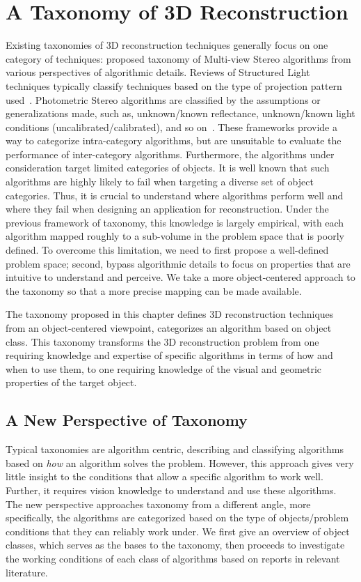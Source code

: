 
\chapter{A Taxonomy of 3D Reconstruction}
\label{ch:3DRecon_Taxo}
Existing taxonomies of 3D reconstruction techniques generally focus on one category of techniques: \citeauthor{seitz2006comparison} proposed taxonomy of Multi-view Stereo algorithms from various perspectives of algorithmic details. Reviews of Structured Light techniques typically classify techniques based on the type of projection pattern used~\cite{geng2011structured, salvi2004pattern}. Photometric Stereo algorithms are classified by the assumptions or generalizations made, such as, unknown/known reflectance, unknown/known light conditions (uncalibrated/calibrated), and so on~\cite{shi2016benchmark}. These frameworks provide a way to categorize intra-category algorithms, but are unsuitable to evaluate the performance of inter-category algorithms. Furthermore, the algorithms under consideration target limited categories of objects. It is well known that such algorithms are highly likely to fail when targeting a diverse set of object categories. Thus, it is crucial to understand where algorithms perform well and where they fail when designing an application for reconstruction. Under the previous framework of taxonomy, this knowledge is largely empirical, with each algorithm mapped roughly to a sub-volume in the problem space that is poorly defined. To overcome this limitation, we need to first propose a well-defined problem space; second, bypass algorithmic details to focus on properties that are intuitive to understand and perceive. We take a more object-centered approach to the taxonomy so that a more precise mapping can be made available.

The taxonomy proposed in this chapter defines 3D reconstruction techniques from an object-centered viewpoint, \ie categorizes an algorithm based on object class. This taxonomy transforms the 3D reconstruction problem from one requiring knowledge and expertise of specific algorithms in terms of how and when to use them, to one requiring knowledge of the visual and geometric properties of the target object.

\section{A New Perspective of Taxonomy}
Typical taxonomies are algorithm centric, describing and classifying algorithms based on \textit{how} an algorithm solves the problem. However, this approach gives very little insight to the conditions that allow a specific algorithm to work well. Further, it requires vision knowledge to understand and use these algorithms. The new perspective approaches taxonomy from a different angle, more specifically, the algorithms are categorized based on the type of objects/problem conditions that they can reliably work under. We first give an overview of object classes, which serves as the bases to the taxonomy, then proceeds to investigate the working conditions of each class of algorithms based on reports in relevant literature.

